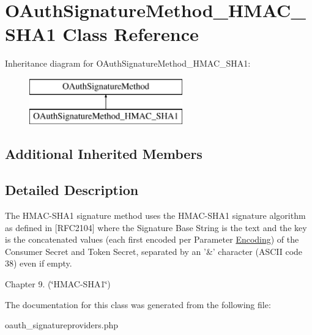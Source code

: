 \hypertarget{class_o_auth_signature_method___h_m_a_c___s_h_a1}{\section{O\-Auth\-Signature\-Method\-\_\-\-H\-M\-A\-C\-\_\-\-S\-H\-A1 Class Reference}
\label{class_o_auth_signature_method___h_m_a_c___s_h_a1}
}
Inheritance diagram for O\-Auth\-Signature\-Method\-\_\-\-H\-M\-A\-C\-\_\-\-S\-H\-A1\-:\begin{figure}[H]
\begin{center}
\leavevmode
\includegraphics[height=2.000000cm]{class_o_auth_signature_method___h_m_a_c___s_h_a1}
\end{center}
\end{figure}
\subsection*{Additional Inherited Members}


\subsection{Detailed Description}
The H\-M\-A\-C-\/\-S\-H\-A1 signature method uses the H\-M\-A\-C-\/\-S\-H\-A1 signature algorithm as defined in \mbox{[}R\-F\-C2104\mbox{]} where the Signature Base String is the text and the key is the concatenated values (each first encoded per Parameter \hyperlink{class_encoding}{Encoding}) of the Consumer Secret and Token Secret, separated by an '\&' character (A\-S\-C\-I\-I code 38) even if empty.
\begin{DoxyItemize}
\item Chapter 9. (\char`\"{}\-H\-M\-A\-C-\/\-S\-H\-A1\char`\"{}) 
\end{DoxyItemize}

The documentation for this class was generated from the following file\-:\begin{DoxyCompactItemize}
\item 
oauth\-\_\-signatureproviders.\-php\end{DoxyCompactItemize}
